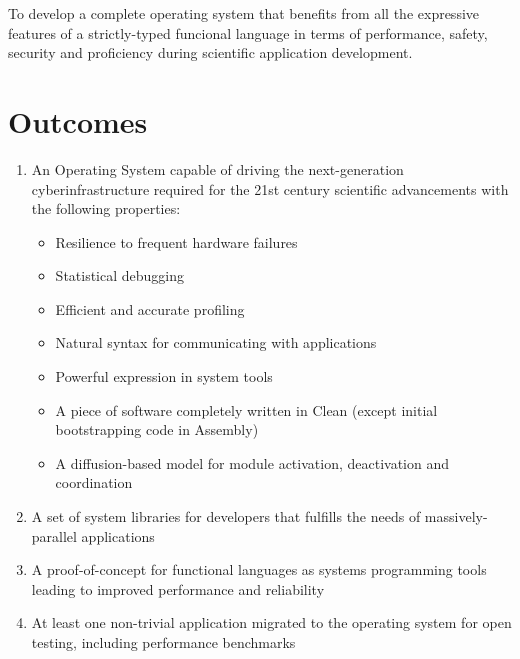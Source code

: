 \documentclass[10pt,a4paper,twocolumn,titlepage]{report}
\begin{document}
To develop a complete operating system that benefits from all the expressive features of a strictly-typed funcional language in terms of performance, safety, security and proficiency during scientific application development.

\section{Outcomes}

\begin{enumerate}
\item An Operating System capable of driving the next-generation cyberinfrastructure required for the 21st century scientific advancements with the following properties:
\begin{itemize}
\item Resilience to frequent hardware failures
\item Statistical debugging
\item Efficient and accurate profiling
\item Natural syntax for communicating with applications
\item Powerful expression in system tools
\item A piece of software completely written in Clean (except initial bootstrapping code in Assembly)
\item A diffusion-based model for module activation, deactivation and coordination
\end{itemize}
\item A set of system libraries for developers that fulfills the needs of massively-parallel applications
\item A proof-of-concept for functional languages as systems programming tools leading to improved performance and reliability
\item At least one non-trivial application migrated to the operating system for open testing, including performance benchmarks
\end{enumerate}
\end{document}
